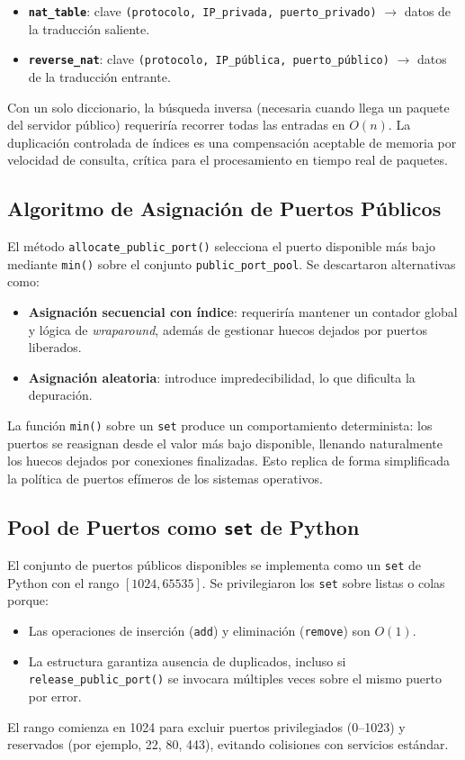 \documentclass[11pt, a4paper]{article}
\begin{document}
\begin{itemize}
    \item \textbf{\texttt{nat\_table}}: clave \texttt{(protocolo, IP\_privada, puerto\_privado)} $\rightarrow$ datos de la traducción saliente.
    \item \textbf{\texttt{reverse\_nat}}: clave \texttt{(protocolo, IP\_pública, puerto\_público)} $\rightarrow$ datos de la traducción entrante.
\end{itemize}

Con un solo diccionario, la búsqueda inversa (necesaria cuando llega un paquete del servidor público) requeriría recorrer todas las entradas en $O(n)$. La duplicación controlada de índices es una compensación aceptable de memoria por velocidad de consulta, crítica para el procesamiento en tiempo real de paquetes.

\subsection{Algoritmo de Asignación de Puertos Públicos}
\label{subsec:asignacion_puertos}

El método \texttt{allocate\_public\_port()} selecciona el puerto disponible más bajo mediante \texttt{min()} sobre el conjunto \texttt{public\_port\_pool}. Se descartaron alternativas como:

\begin{itemize}
    \item \textbf{Asignación secuencial con índice}: requeriría mantener un contador global y lógica de \textit{wraparound}, además de gestionar huecos dejados por puertos liberados.
    \item \textbf{Asignación aleatoria}: introduce impredecibilidad, lo que dificulta la depuración.
\end{itemize}

La función \texttt{min()} sobre un \texttt{set} produce un comportamiento determinista: los puertos se reasignan desde el valor más bajo disponible, llenando naturalmente los huecos dejados por conexiones finalizadas. Esto replica de forma simplificada la política de puertos efímeros de los sistemas operativos.

\subsection{Pool de Puertos como \texttt{set} de Python}
\label{subsec:pool_set}

El conjunto de puertos públicos disponibles se implementa como un \texttt{set} de Python con el rango $[1024, 65535]$. Se privilegiaron los \texttt{set} sobre listas o colas porque:
\begin{itemize}
    \item Las operaciones de inserción (\texttt{add}) y eliminación (\texttt{remove}) son $O(1)$.
    \item La estructura garantiza ausencia de duplicados, incluso si \texttt{release\_public\_port()} se invocara múltiples veces sobre el mismo puerto por error.
\end{itemize}
El rango comienza en 1024 para excluir puertos privilegiados (0--1023) y reservados (por ejemplo, 22, 80, 443), evitando colisiones con servicios estándar.
\end{document}
